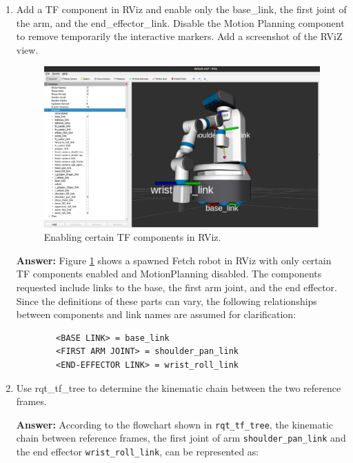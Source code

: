 \documentclass[12pt]{article}
\begin{document}
\begin{enumerate}

    \item Add a TF component in RViz and enable only the base\_link, the first joint of the arm, and the end\_effector\_link. Disable the Motion Planning component to remove temporarily the interactive markers. Add a screenshot of the RViZ view.

    \begin{figure}[h]
        \centering\includegraphics[width=14cm]{images/fetch_default.png}
        \caption{Enabling certain TF components in RViz.}\label{fig:fetch_default}\vspace{-4pt}
    \end{figure}

    \textbf{Answer: }Figure \ref{fig:fetch_default} shows a spawned Fetch robot in RViz with only certain TF components enabled and MotionPlanning disabled. The components requested include links to the base, the first arm joint, and the end effector. Since the definitions of these parts can vary, the following relationships between components and link names are assumed for clarification:

    \begin{verbatim}
        <BASE LINK> = base_link
        <FIRST ARM JOINT> = shoulder_pan_link
        <END-EFFECTOR LINK> = wrist_roll_link
    \end{verbatim}
    \vspace{-10pt}

    \item Use rqt\_tf\_tree to determine the kinematic chain between the two reference frames.
    
    \textbf{Answer: }According to the flowchart shown in \texttt{rqt_tf_tree}, the kinematic chain between reference frames, the first joint of arm \texttt{shoulder_pan_link} and the end effector \texttt{wrist_roll_link}, can be represented as:


\end{enumerate}
\end{document}
